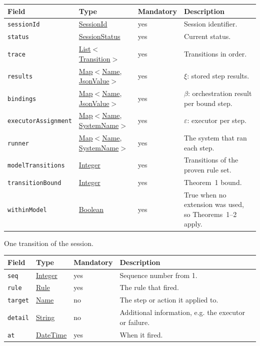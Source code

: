 \documentclass[a4paper]{arrowhead}
\newcommand{\mref}[1]{{\textcolor{ArrowheadPurple}{\hyperref[sec:model:#1]{#1}}}}
\newcommand{\pref}[1]{{\textcolor{ArrowheadGrey}{\hyperref[sec:model:primitives:#1]{#1}}}}
\begin{document}
{\small
\begin{longtable}{|p{3.7cm}|p{4.2cm}|p{1.6cm}|p{6.3cm}|}

\hline
\rowcolor{gray!33} Field & Type & Mandatory & Description \\ \hline
\endhead
\texttt{sessionId} & \pref{SessionId} & yes & Session identifier. \\ \hline
\texttt{status} & \mref{SessionStatus} & yes & Current status. \\ \hline
\texttt{trace} & \pref{List}$<$\mref{Transition}$>$ & yes & Transitions in order. \\ \hline
\texttt{results} & \pref{Map}$<$\pref{Name}, \pref{JsonValue}$>$ & yes & $\xi$: stored step results. \\ \hline
\texttt{bindings} & \pref{Map}$<$\pref{Name}, \pref{JsonValue}$>$ & yes & $\beta$: orchestration result per bound step. \\ \hline
\texttt{executorAssignment} & \pref{Map}$<$\pref{Name}, \pref{SystemName}$>$ & yes & $\varepsilon$: executor per step. \\ \hline
\texttt{runner} & \pref{Map}$<$\pref{Name}, \pref{SystemName}$>$ & yes & The system that ran each step. \\ \hline
\texttt{modelTransitions} & \pref{Integer} & yes & Transitions of the proven rule set. \\ \hline
\texttt{transitionBound} & \pref{Integer} & yes & Theorem~1 bound. \\ \hline
\texttt{withinModel} & \pref{Boolean} & yes & True when no extension was used, so Theorems~1--2 apply. \\ \hline
\end{longtable}
}

One transition of the session.

{\small
\begin{longtable}{|p{3.7cm}|p{4.2cm}|p{1.6cm}|p{6.3cm}|}

\hline
\rowcolor{gray!33} Field & Type & Mandatory & Description \\ \hline
\endhead
\texttt{seq} & \pref{Integer} & yes & Sequence number from 1. \\ \hline
\texttt{rule} & \mref{Rule} & yes & The rule that fired. \\ \hline
\texttt{target} & \pref{Name} & no & The step or action it applied to. \\ \hline
\texttt{detail} & \pref{String} & no & Additional information, e.g. the executor or failure. \\ \hline
\texttt{at} & \pref{DateTime} & yes & When it fired. \\ \hline
\end{longtable}
}
\end{document}
